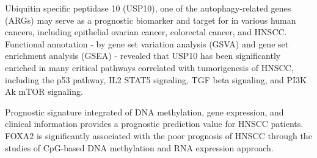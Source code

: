 \documentclass[preprint,12pt]{elsarticle}
\newenvironment{MyColorPar}[1]{%
    \leavevmode\color{#1}\ignorespaces%
}{%
}%
\begin{document}
\begin{MyColorPar}{blue}
Ubiquitin specific peptidase 10 (USP10), one of the autophagy-related genes (ARGs) may serve as a prognostic biomarker and target for in various human cancers, including epithelial ovarian cancer, colorectal cancer, and HNSCC\cite{Ren2020}.
Functional annotation - by gene set variation analysis (GSVA) and gene set enrichment analysis (GSEA) - revealed that USP10 has been significantly enriched in many critical pathways correlated with tumorigenesis of HNSCC, including the p53 pathway, IL2 STAT5 signaling, TGF beta signaling, and PI3K Ak mTOR signaling\cite{Ren2020}.

Prognostic signature integrated of DNA methylation, gene expression, and clinical information provides a prognostic prediction value for HNSCC patients. 
FOXA2 is significantly associated with the poor prognosis of HNSCC through the studies of CpG-based DNA methylation and RNA expression approach\cite{Shen2017a}.



\end{MyColorPar}
\end{document}
